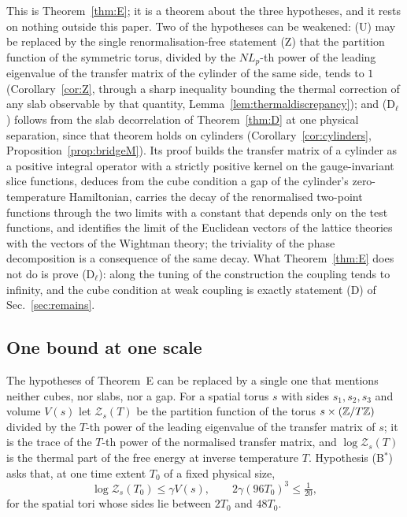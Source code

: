 This is Theorem~\ref{thm:E}; it is a theorem about the three hypotheses, and
it rests on nothing outside this paper. Two of the hypotheses can be
weakened: (U) may be replaced by the single renormalisation-free statement
(Z) that the partition function of the symmetric torus, divided by the
$NL_p$-th power of the leading eigenvalue of the transfer matrix of the
cylinder of the same side, tends to $1$ (Corollary~\ref{cor:Z}, through a
sharp inequality bounding the thermal correction of any slab observable by
that quantity, Lemma~\ref{lem:thermaldiscrepancy}); and (D$_\ell$) follows
from the slab decorrelation of Theorem~\ref{thm:D} at one physical
separation, since that theorem holds on cylinders
(Corollary~\ref{cor:cylinders}, Proposition~\ref{prop:bridgeM}). Its proof builds the transfer matrix of a
cylinder as a positive integral operator with a strictly positive kernel on
the gauge-invariant slice functions, deduces from the cube condition a gap of
the cylinder's zero-temperature Hamiltonian, carries the decay of the
renormalised two-point functions through the two limits with a constant that
depends only on the test functions, and identifies the limit of the Euclidean
vectors of the lattice theories with the vectors of the Wightman theory; the
triviality of the phase decomposition is a consequence of the same decay.
What Theorem~\ref{thm:E} does not do is prove (D$_\ell$): along the tuning of
the construction the coupling tends to infinity, and the cube condition at
weak coupling is exactly statement (D) of Sec.~\ref{sec:remains}.

\subsection{One bound at one scale}

The hypotheses of Theorem~E can be replaced by a single one that mentions
neither cubes, nor slabs, nor a gap. For a spatial torus $s$ with sides
$s_1,s_2,s_3$ and volume $V(s)$ let $\mathcal Z_s(T)$ be the partition
function of the torus $s\times(\mathbb{Z}/T\mathbb{Z})$ divided by the $T$-th power of the
leading eigenvalue of the transfer matrix of $s$; it is the trace of the
$T$-th power of the normalised transfer matrix, and $\log\mathcal Z_s(T)$ is
the thermal part of the free energy at inverse temperature $T$. Hypothesis
(B$^{*}$) asks that, at one time extent $T_0$ of a fixed physical size,
\[
\log\mathcal Z_s(T_0)\le\gamma V(s),\qquad 2\gamma(96T_0)^3\le\tfrac1{20},
\]
for the spatial tori whose sides lie between $2T_0$ and $48T_0$.

